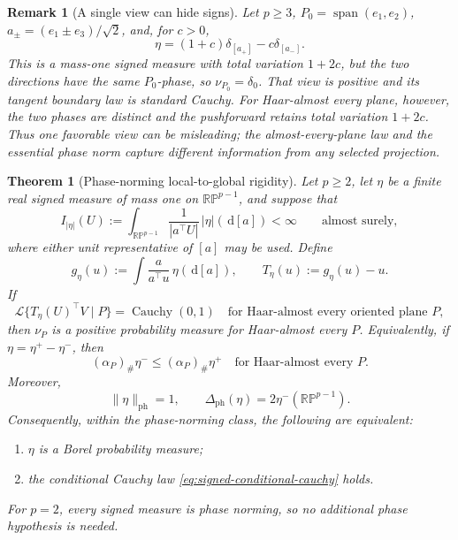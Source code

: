 \documentclass[11pt]{article}
\numberwithin{equation}{section}
\theoremstyle{thmstyleone}%
\newtheorem{theorem}{Theorem}[section]
\theoremstyle{thmstyletwo}%
\newtheorem*{remark}{Remark}%
\let\cref\autoref
\newcommand{\dd}{\,\mathrm d}
\newcommand{\Cauchy}{\operatorname{Cauchy}}
\newcommand{\Law}{\mathcal L}
\begin{document}
\begin{remark}[A single view can hide signs]
Let \(p\geq3\), \(P_0=\operatorname{span}(e_1,e_2)\),
\(a_\pm=(e_1\pm e_3)/\sqrt2\), and, for \(c>0\),
\[
  \eta=(1+c)\delta_{[a_+]}-c\delta_{[a_-]}.
\]
This is a mass-one signed measure with total variation \(1+2c\), but the two
directions have the same \(P_0\)-phase, so \(\nu_{P_0}=\delta_0\).  That view
is positive and its tangent boundary law is standard Cauchy.  For
Haar-almost every plane, however, the two phases are distinct and the
pushforward retains total variation \(1+2c\).  Thus one favorable view can be
misleading; the almost-every-plane law and the essential phase norm capture
different information from any selected projection.
\end{remark}

\begin{theorem}[Phase-norming local-to-global rigidity]
\label{thm:thin-support-rigidity}
Let \(p\geq2\), let \(\eta\) be a finite real signed measure of mass one on
\(\mathbb{RP}^{p-1}\), and suppose that
\begin{equation}
  I_{|\eta|}(U)
  :=\int_{\mathbb{RP}^{p-1}}
      \frac{1}{|a^\top U|}\,|\eta|(\dd[a])
  <\infty
  \qquad\text{almost surely},
  \label{eq:signed-reciprocal-integrability}
\end{equation}
where either unit representative of \([a]\) may be used.  Define
\begin{equation}
  g_\eta(u)
  :=\int\frac{a}{a^\top u}\,\eta(\dd[a]),
  \qquad
  T_\eta(u):=g_\eta(u)-u.
  \label{eq:signed-projective-field}
\end{equation}
If
\begin{equation}
  \Law\{T_\eta(U)^\top V\mid P\}=\Cauchy(0,1)
  \quad\text{for Haar-almost every oriented plane }P,
  \label{eq:signed-conditional-cauchy}
\end{equation}
then \(\nu_P\) is a positive probability measure for Haar-almost every
\(P\).  Equivalently, if \(\eta=\eta^+-\eta^-\), then
\begin{equation}
  (\alpha_P)_\#\eta^-
  \leq
  (\alpha_P)_\#\eta^+
  \quad\text{for Haar-almost every }P.
  \label{eq:phase-jordan-domination}
\end{equation}
Moreover,
\begin{equation}
  \|\eta\|_{\mathrm{ph}}=1,
  \qquad
  \Delta_{\mathrm{ph}}(\eta)
  =2\eta^-(\mathbb{RP}^{p-1}).
  \label{eq:phase-deficit-negative-mass}
\end{equation}
Consequently, within the phase-norming class, the following are equivalent:
\begin{enumerate}[label=\textup{(\roman*)}]
\item \(\eta\) is a Borel probability measure;
\item the conditional Cauchy law \cref{eq:signed-conditional-cauchy} holds.
\end{enumerate}
For \(p=2\), every signed measure is phase norming, so no additional phase
hypothesis is needed.
\end{theorem}
\end{document}
